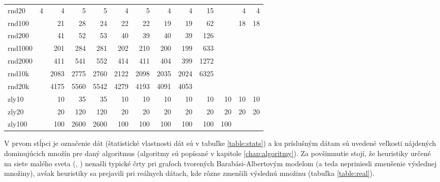 \begin{landscape}
\begin{table}[h]
{\begin{tabular}{l|rrrrrrrrrrrr}
		rnd20   & 4     & 4      & 5       & 5        & 4        & 5        & 4       & 4      & 15         &            & 4      & 4       \\
		rnd100  &       & 21     & 28      & 24       & 22       & 22       & 19      & 19     & 62         &            & 18     & 18      \\
		rnd200  &       & 41     & 52      & 53       & 40       & 39       & 40      & 39     & 126        &            &        &         \\
		rnd1000 &       & 201    & 284     & 281      & 202      & 210      & 200     & 199    & 633        &            &        &         \\
		rnd2000 &       & 411    & 541     & 552      & 414      & 411      & 404     & 399    & 1272       &            &        &         \\
		rnd10k  &       & 2083   & 2775    & 2760     & 2122     & 2098     & 2035    & 2024   & 6325       &            &        &         \\
		rnd20k  &       & 4175   & 5560    & 5542     & 4279     & 4193     & 4091    & 4053   &            &            &        &         \\
		zly10   &       & 10     & 35      & 35       & 10       & 10       & 10      & 10     & 10         & 10         & 10     & 10      \\
		zly20   &       & 20     & 120     & 120      & 20       & 20       & 20      & 20     & 20         & 20         & 20     & 20      \\
		zly100  &       & 100    & 2600    & 2600     & 100      & 100      & 100     & 100    & 100        & 100        &        &         \\ \hline
	\end{tabular}
}
	\smallskip \par
	{\footnotesize 
	V prvom stĺpci je označenie dát (štatistické vlastnosti dát sú v tabuľke 
	\ref{table:stats}) a ku príslušným dátam sú uvedené veľkosti nájdených 
	dominujúcich množín pre daný algoritmus (algoritmy sú popísané v kapitole 
	\ref{chap:algoritmy}). Za povšimnutie stojí, že 
	heuristiky určené na siete malého sveta (, ) 
	nenašli typické črty pri grafoch tvorených Barabási-Albertovým modelom 
	(a teda nepriniesli zmenšenie výslednej množiny), 	avšak heuristiky sa 
	prejavili pri reálnych dátach, kde rôzne zmenšili výslednú množinu 
	(tabuľka \ref{table:real}).}
	\label{table:size}
\end{table}

\end{landscape}


